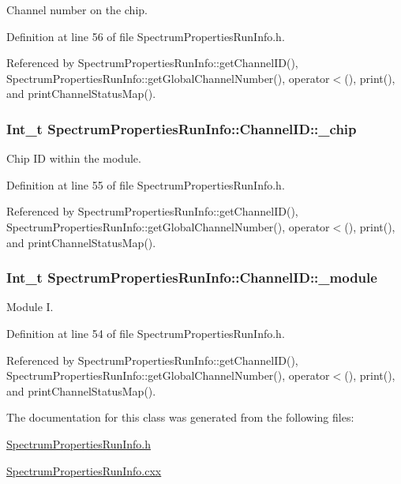 Channel number on the chip. 

Definition at line 56 of file SpectrumPropertiesRunInfo.h.

Referenced by SpectrumPropertiesRunInfo::getChannelID(), SpectrumPropertiesRunInfo::getGlobalChannelNumber(), operator$<$(), print(), and printChannelStatusMap().\hypertarget{class_spectrum_properties_run_info_1_1_channel_i_d_a4aa4404441ca9ef720a7a1dbcf412aae}{
\subsubsection[{\_\-chip}]{\setlength{\rightskip}{0pt plus 5cm}Int\_\-t {\bf SpectrumPropertiesRunInfo::ChannelID::\_\-chip}}}
\label{class_spectrum_properties_run_info_1_1_channel_i_d_a4aa4404441ca9ef720a7a1dbcf412aae}


Chip ID within the module. 

Definition at line 55 of file SpectrumPropertiesRunInfo.h.

Referenced by SpectrumPropertiesRunInfo::getChannelID(), SpectrumPropertiesRunInfo::getGlobalChannelNumber(), operator$<$(), print(), and printChannelStatusMap().\hypertarget{class_spectrum_properties_run_info_1_1_channel_i_d_a6f0c9069040d61b614f91152d80e7fa9}{
\subsubsection[{\_\-module}]{\setlength{\rightskip}{0pt plus 5cm}Int\_\-t {\bf SpectrumPropertiesRunInfo::ChannelID::\_\-module}}}
\label{class_spectrum_properties_run_info_1_1_channel_i_d_a6f0c9069040d61b614f91152d80e7fa9}


Module I. 

Definition at line 54 of file SpectrumPropertiesRunInfo.h.

Referenced by SpectrumPropertiesRunInfo::getChannelID(), SpectrumPropertiesRunInfo::getGlobalChannelNumber(), operator$<$(), print(), and printChannelStatusMap().

The documentation for this class was generated from the following files:\begin{DoxyCompactItemize}
\item 
\hyperlink{_spectrum_properties_run_info_8h}{SpectrumPropertiesRunInfo.h}\item 
\hyperlink{_spectrum_properties_run_info_8cxx}{SpectrumPropertiesRunInfo.cxx}\end{DoxyCompactItemize}
